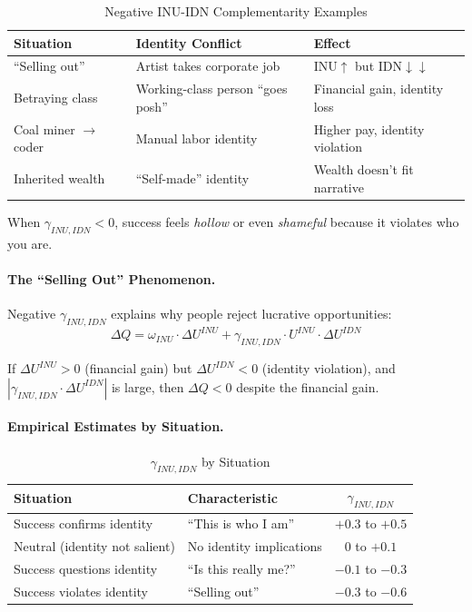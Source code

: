 \begin{table}[htbp]
\centering
\caption{Negative INU-IDN Complementarity Examples}
\label{tab:app-c-inu-idn-negative}
\renewcommand{\arraystretch}{1.3}
\begin{tabular}{@{}lll@{}}
\toprule
\textbf{Situation} & \textbf{Identity Conflict} & \textbf{Effect} \\
\midrule
``Selling out'' & Artist takes corporate job & INU$\uparrow$ but IDN$\downarrow\downarrow$ \\
Betraying class & Working-class person ``goes posh'' & Financial gain, identity loss \\
Coal miner $\to$ coder & Manual labor identity & Higher pay, identity violation \\
Inherited wealth & ``Self-made'' identity & Wealth doesn't fit narrative \\
\bottomrule
\end{tabular}
\end{table}

When $\gamma_{INU,IDN} < 0$, success feels \emph{hollow} or even \emph{shameful}
because it violates who you are.

\paragraph{The ``Selling Out'' Phenomenon.}
Negative $\gamma_{INU,IDN}$ explains why people reject lucrative opportunities:
\begin{equation}
\Delta Q = \omega_{INU} \cdot \Delta U^{INU} + \gamma_{INU,IDN} \cdot U^{INU} \cdot \Delta U^{IDN}
\end{equation}

If $\Delta U^{INU} > 0$ (financial gain) but $\Delta U^{IDN} < 0$ (identity violation),
and $|\gamma_{INU,IDN} \cdot \Delta U^{IDN}|$ is large, then $\Delta Q < 0$ despite 
the financial gain.

\paragraph{Empirical Estimates by Situation.}

\begin{table}[htbp]
\centering
\caption{$\gamma_{INU,IDN}$ by Situation}
\label{tab:app-c-gamma-inu-idn-context}
\renewcommand{\arraystretch}{1.3}
\begin{tabular}{@{}llc@{}}
\toprule
\textbf{Situation} & \textbf{Characteristic} & $\gamma_{INU,IDN}$ \\
\midrule
Success confirms identity & ``This is who I am'' & $+0.3$ to $+0.5$ \\
Neutral (identity not salient) & No identity implications & $0$ to $+0.1$ \\
Success questions identity & ``Is this really me?'' & $-0.1$ to $-0.3$ \\
Success violates identity & ``Selling out'' & $-0.3$ to $-0.6$ \\
\bottomrule
\end{tabular}
\end{table}

